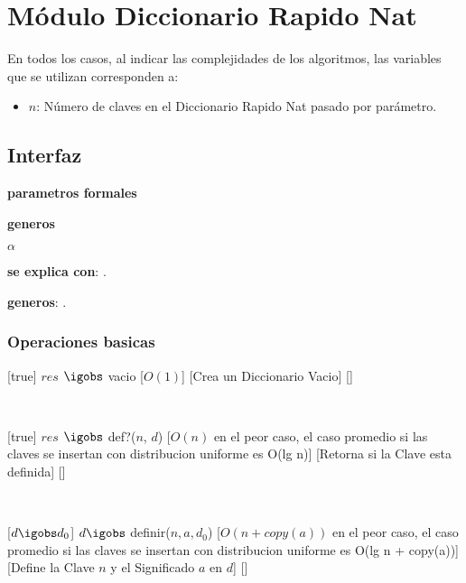 \section{M\'odulo Diccionario Rapido Nat}

  En todos los casos, al indicar las complejidades de los algoritmos, las variables que se utilizan corresponden a:
  \vspace{-0.5em}\begin{itemize}
    \item $n$: N\'umero de claves en el Diccionario Rapido Nat pasado por par\'ametro.

  \end{itemize}
  


\subsection{Interfaz}
  
  \textbf{parametros formales}  \parindent \\
  \parbox{1.7cm}{\textbf{generos}} $\alpha$
  
  \textbf{se explica con}: .
 
  \textbf{generos}: .
  

  \subsubsection{Operaciones basicas}
  
  [true]
  {$res$ $\igobs$ vacio}%
  [$O(1)$]
  [Crea un Diccionario Vacio]
  []

  ~

 [true]
{$res$ $\igobs$ def?($n$, $d$)}
[$O(n)$ en el peor caso, el caso promedio si las claves se insertan con distribucion uniforme es O(lg n)]
[Retorna si la Clave esta definida]
[]
  
  ~

  [$ d \igobs d_0 $]
  {$ d \igobs$ definir($n, a, d_0$)}
  [$O(n + copy(a))$ en el peor caso, el caso promedio si las claves se insertan con distribucion uniforme es O(lg n + copy(a))]
  [Define la Clave $n$ y el Significado $a$ en $d$]
  []
  
